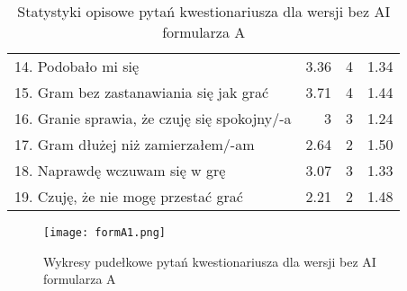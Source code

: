 \begin{table}[h!]
\begin{center}
\begin{tabular}{|m{10em}|r|r|r|}
            14. Podobało mi się                                               & 3.36          & 4       & 1.34           \\
            15. Gram bez zastanawiania się jak grać                           & 3.71          & 4       & 1.44           \\
            16. Granie sprawia, \newline że czuję się spokojny/-a             & 3             & 3       & 1.24           \\
            17. Gram dłużej \newline niż zamierzałem/-am                      & 2.64          & 2       & 1.50           \\
            18. Naprawdę wczuwam się w grę                                    & 3.07          & 3       & 1.33           \\
            19. Czuję, że nie mogę przestać grać                              & 2.21          & 2       & 1.48           \\
            \hline
        \end{tabular}
    \end{center}
    \caption{Statystyki opisowe pytań kwestionariusza dla wersji bez AI formularza A}\label{tab1:ch7_6}
\end{table}

\begin{figure}[h!]
    \centering
    \texttt{[image: formA1.png]}
    \caption{Wykresy pudełkowe pytań kwestionariusza dla wersji bez AI formularza A}
    \label{fig:ch7_formA1}
\end{figure}

